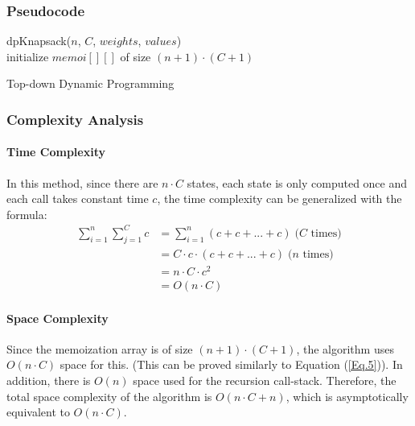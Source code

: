 \documentclass{article}
\begin{document}
\subsubsection{Pseudocode}
\begin{algorithm}[H]
\SetAlgoLined
{}
dpKnapsack($n$, $C$, $weights$, $values$) \\
initialize $memoi[][]$ of size $(n+1)\cdot (C+1)$ \; \\
 \caption{Top-down Dynamic Programming}
\end{algorithm}

\subsubsection{Complexity Analysis}
\paragraph{Time Complexity}
In this method, since there are $n \cdot C$ states, each state is only computed once and each call takes constant time $c$, the time complexity can be generalized with the formula: 
\begin{equation}
    \begin{split}
        \sum_{i=1}^{n} \sum_{j=1}^{C} c & = \sum_{i=1}^{n} (c + c + ... + c) \; \text{($C$ times)} \\
        & = C \cdot c \cdot (c + c + ... + c) \; \text{($n$ times)} \\
        & = n \cdot C \cdot c^2 \\
        & = O(n \cdot C)
    \end{split}
    \label{Eq.4}
\end{equation}

\paragraph{Space Complexity}
Since the memoization array is of size $(n+1) \cdot (C+1)$, the algorithm uses $O(n\cdot C)$ space for this. (This can be proved similarly to Equation (\ref{Eq.5})). In addition, there is $O(n)$ space used for the recursion call-stack. Therefore, the total space complexity of the algorithm is $O(n\cdot C + n)$, which is asymptotically equivalent to $O(n\cdot C)$.
\end{document}
